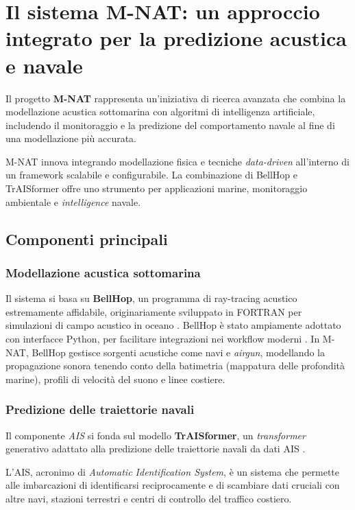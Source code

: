 \chapter{Il sistema M-NAT: un approccio integrato per la predizione acustica e navale}

Il progetto \textbf{M-NAT} rappresenta un'iniziativa di ricerca avanzata che combina la modellazione acustica sottomarina con algoritmi di intelligenza artificiale, includendo il monitoraggio e la predizione del comportamento navale al fine di una modellazione più accurata.

M-NAT innova integrando modellazione fisica e tecniche \textit{data-driven} all'interno di un framework scalabile e configurabile. La combinazione di BellHop e TrAISformer offre uno strumento per applicazioni marine, monitoraggio ambientale e \textit{intelligence} navale.

\section{Componenti principali}

\subsection{Modellazione acustica sottomarina}

Il sistema si basa su \textbf{BellHop}, un programma di ray-tracing acustico estremamente affidabile, originariamente sviluppato in FORTRAN per simulazioni di campo acustico in oceano \cite{porter2011bellhop,long2012bellhop}. BellHop è stato ampiamente adottato con interfacce Python, per facilitare integrazioni nei workflow moderni \cite{fang2024bellhop}. In M-NAT, BellHop gestisce sorgenti acustiche come navi e \textit{airgun}, modellando la propagazione sonora tenendo conto della batimetria (mappatura delle profondità marine), profili di velocità del suono e linee costiere.

\subsection{Predizione delle traiettorie navali}

Il componente \textit{AIS} si fonda sul modello \textbf{TrAISformer}, un \textit{transformer} generativo adattato alla predizione delle traiettorie navali da dati AIS \cite{nguyen2021traisformer}. 

L'AIS, acronimo di \textit{Automatic Identification System}, è un sistema che permette alle imbarcazioni di identificarsi reciprocamente e di scambiare dati cruciali con altre navi, stazioni terrestri e centri di controllo del traffico costiero.

